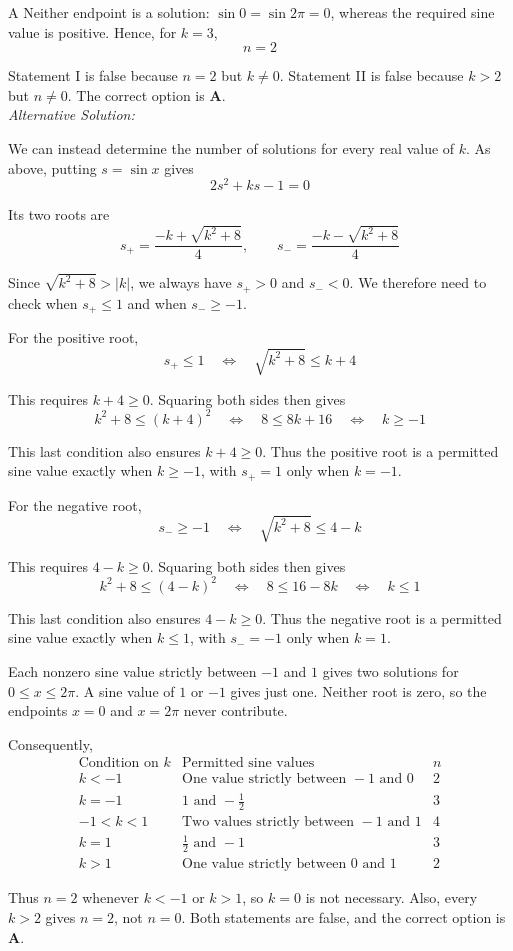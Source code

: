 \documentclass[11pt,a4paper]{article}
\begin{document}
\begin{enumerate}[label=\textbf{\arabic*.},leftmargin=*,itemsep=0pt,start=9]
\begin{djsSolution}{A}
Neither endpoint is a solution: $\sin0=\sin2\pi=0$, whereas the required sine value is positive. Hence, for $k=3$,
\[
n=2
\]

Statement I is false because $n=2$ but $k\ne0$. Statement II is false because $k>2$ but $n\ne0$. The correct option is \textbf{A}.\\[5pt]

\textit{Alternative Solution:}

We can instead determine the number of solutions for every real value of $k$. As above, putting $s=\sin x$ gives
\[
2s^2+ks-1=0
\]

Its two roots are
\[
s_+=\frac{-k+\sqrt{k^2+8}}4,
\qquad
s_-=\frac{-k-\sqrt{k^2+8}}4
\]

Since $\sqrt{k^2+8}>|k|$, we always have $s_+>0$ and $s_-<0$. We therefore need to check when $s_+\le1$ and when $s_-\ge-1$.

For the positive root,
\[
s_+\le1
\quad\Longleftrightarrow\quad
\sqrt{k^2+8}\le k+4
\]

This requires $k+4\ge0$. Squaring both sides then gives
\[
k^2+8\le(k+4)^2
\quad\Longleftrightarrow\quad
8\le8k+16
\quad\Longleftrightarrow\quad
k\ge-1
\]

This last condition also ensures $k+4\ge0$. Thus the positive root is a permitted sine value exactly when $k\ge-1$, with $s_+=1$ only when $k=-1$.

For the negative root,
\[
s_-\ge-1
\quad\Longleftrightarrow\quad
\sqrt{k^2+8}\le4-k
\]

This requires $4-k\ge0$. Squaring both sides then gives
\[
k^2+8\le(4-k)^2
\quad\Longleftrightarrow\quad
8\le16-8k
\quad\Longleftrightarrow\quad
k\le1
\]

This last condition also ensures $4-k\ge0$. Thus the negative root is a permitted sine value exactly when $k\le1$, with $s_-=-1$ only when $k=1$.

Each nonzero sine value strictly between $-1$ and $1$ gives two solutions for $0\le x\le2\pi$. A sine value of $1$ or $-1$ gives just one. Neither root is zero, so the endpoints $x=0$ and $x=2\pi$ never contribute.

Consequently,
\[
\begin{array}{c|c|c}
\text{Condition on }k & \text{Permitted sine values} & n\\ \hline
k<-1 & \text{One value strictly between }-1\text{ and }0 & 2\\[5pt]
k=-1 & 1\text{ and }-\frac12 & 3\\[5pt]
-1<k<1 & \text{Two values strictly between }-1\text{ and }1 & 4\\[5pt]
k=1 & \frac12\text{ and }-1 & 3\\[5pt]
k>1 & \text{One value strictly between }0\text{ and }1 & 2
\end{array}
\]

Thus $n=2$ whenever $k<-1$ or $k>1$, so $k=0$ is not necessary. Also, every $k>2$ gives $n=2$, not $n=0$. Both statements are false, and the correct option is \textbf{A}.
\end{djsSolution}
\end{enumerate}
\end{document}
